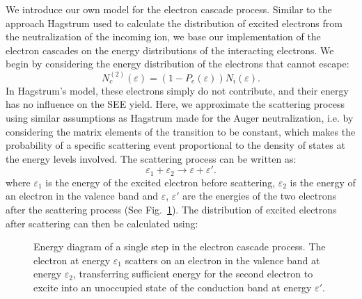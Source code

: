 \begin{refsection}
We introduce our own model for the electron cascade process. Similar to the 
approach Hagstrum used to calculate the distribution of excited electrons from 
the neutralization of the incoming ion, we base our implementation of the 
electron cascades on the energy distributions of the interacting electrons. We 
begin by considering the energy distribution of the electrons that cannot 
escape: 
\begin{equation} 
N_c^{(2)}(\varepsilon) = (1-P_e(\varepsilon))N_i(\varepsilon). 
\end{equation} 
In Hagstrum's model, these electrons simply do not contribute, and their 
energy has no influence on the \gls{SEE} yield. Here, we approximate the scattering 
process using similar assumptions as Hagstrum made for the Auger 
neutralization, i.e. by considering the matrix elements of the transition to 
be constant, which makes the probability of a specific scattering event 
proportional to the density of states at the energy levels involved. The 
scattering process can be written as: 
\begin{equation}\label{quotas:eq-scattering} 
\varepsilon_1 + \varepsilon_2 \rightarrow \varepsilon + \varepsilon'. 
\end{equation} 
where $\varepsilon_1$ is the energy of the excited electron before scattering, 
$\varepsilon_2$ is the energy of an electron in the valence band and 
$\varepsilon$, $\varepsilon'$ are the energies of the two electrons after the 
scattering process (See Fig.~\ref{quotas:fig-cascades}). The distribution of 
excited electrons after scattering can then be calculated using: 

\begin{figure}[ht] 
\centering 
\captionsetup{width=0.9\textwidth}
 
\caption{\label{quotas:fig-cascades}Energy diagram of a single step in the 
electron cascade process. The electron at energy $\varepsilon_1$ scatters on 
an electron in the valence band at energy $\varepsilon_2$, transferring 
sufficient energy for the second electron to excite into an unoccupied state 
of the conduction band at energy $\varepsilon'$.} 
\end{figure} 


\end{refsection}
